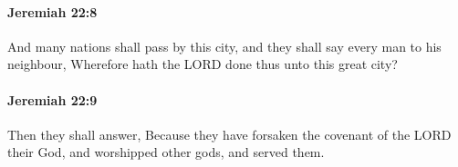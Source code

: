 		\paragraph{Jeremiah 22:8} %
			\label{JEREMIAH-22-8}

			And many nations shall pass by this city, and they shall say every man to his neighbour, Wherefore hath the LORD done thus unto this great city?


		\paragraph{Jeremiah 22:9} %
			\label{JEREMIAH-22-9}

			Then they shall answer, Because they have forsaken the covenant of the LORD their God, and worshipped other gods, and served them.


